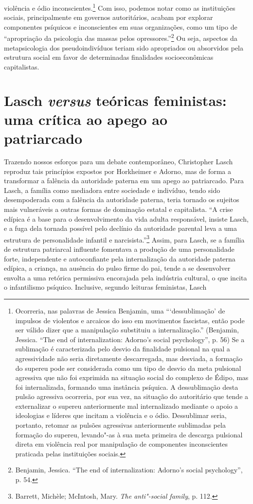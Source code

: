 violência e ódio inconscientes.\footnote{Ocorreria, nas palavras de
  Jessica Benjamin, uma ```dessublimação' de impulsos de violentos e
  arcaicos do isso em movimentos fascistas, então pode ser válido dizer
  que a manipulação substituiu a internalização.'' (Benjamin, Jessica.
  ``The end of internalization: Adorno's social psychology'', p. 56) Se
  a sublimação é caracterizada pelo desvio da finalidade pulsional na
  qual a agressividade não seria diretamente descarregada, mas desviada,
  a formação do supereu pode ser considerada como um tipo de desvio da
  meta pulsional agressiva que não foi exprimida na situação social do
  complexo de Édipo, mas foi internalizada, formando uma instância
  psíquica. A dessublimação desta pulsão agressiva ocorreria, por sua
  vez, na situação do autoritário que tende a externalizar o supereu
  anteriormente mal internalizado mediante o apoio a ideologias e
  líderes que incitam a violência e o ódio. Dessublimar seria, portanto,
  retomar as pulsões agressivas anteriormente sublimadas pela formação
  do supereu, levando"-as à sua meta primeira de descarga pulsional
  direta em violência real por manipulação de componentes inconscientes
  praticada pelas instituições sociais.} Com isso, podemos notar como
as instituições sociais, principalmente em governos autoritários, acabam
por explorar componentes psíquicos e inconscientes em suas organizações,
como um tipo de ``apropriação da psicologia das massas pelos
opressores.''\footnote{Benjamin, Jessica. ``The end of internalization:
  Adorno's social psychology'', p. 54.} Ou seja, aspectos da
metapsicologia dos pseudoindivíduos teriam sido apropriados ou
absorvidos pela estrutura social em favor de determinadas finalidades
socioeconômicas capitalistas.

\section{Lasch \emph{versus} teóricas feministas: uma crítica ao apego ao
patriarcado}

Trazendo nossos esforços para um debate contemporâneo, Christopher Lasch
reproduz tais princípios expostos por Horkheimer e Adorno, mas de forma
a transformar a falência da autoridade paterna em um apego ao
patriarcado. Para Lasch, a família como mediadora entre sociedade e
indivíduo, tendo sido desempoderada com a falência da autoridade
paterna, teria tornado os sujeitos mais vulneráveis a outras formas de
dominação estatal e capitalista. ``A crise edípica é a base para o
desenvolvimento da vida adulta responsável, insiste Lasch, e a fuga dela
tornada possível pelo declínio da autoridade parental leva a uma
estrutura de personalidade infantil e narcisista.''\footnote{Barrett,
  Michèle; McIntosh, Mary. \emph{The anti"-social family}, p. 112.}
Assim, para Lasch, se a família de estrutura patriarcal influente
fomentava a produção de uma personalidade forte, independente e
autoconfiante pela internalização da autoridade paterna edípica, a
criança, na ausência do pulso firme do pai, tende a se desenvolver
envolta a uma retórica permissiva encorajada pela indústria cultural, o
que incita o infantilismo psíquico. Inclusive, segundo leituras
feministas, Lasch

